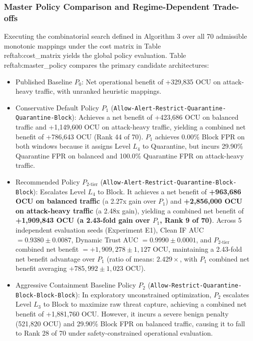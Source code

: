\documentclass[journal,10pt,onecolumn]{IEEEtran}
\begin{document}
\subsubsection{Master Policy Comparison and Regime-Dependent Trade-offs}
Executing the combinatorial search defined in Algorithm 3 over all 70 admissible monotonic mappings under the cost matrix in Table~\\ref{tab:cost_matrix} yields the global policy evaluation. Table~\\ref{tab:master_policy} compares the primary candidate architectures:
\begin{itemize}
  \item Published Baseline $P_0$: Net operational benefit of +329,835 OCU on attack-heavy traffic, with unranked heuristic mappings.
  \item Conservative Default Policy $P_1$ (\texttt{Allow-Alert-Restrict-Quarantine-Quarantine-Block}): Achieves a net benefit of +423,686 OCU on balanced traffic and +1,149,600 OCU on attack-heavy traffic, yielding a combined net benefit of +786,643 OCU (Rank 44 of 70). $P_1$ achieves 0.00\% Block FPR on both windows because it assigns Level $L_4$ to Quarantine, but incurs 29.90\% Quarantine FPR on balanced and 100.0\% Quarantine FPR on attack-heavy traffic.
  \item Recommended Policy $P_{2\text{-tier}}$ (\texttt{Allow-Alert-Restrict-Quarantine-Block-Block}): Escalates Level $L_4$ to Block. It achieves a net benefit of \textbf{+963,686 OCU on balanced traffic} (a 2.27x gain over $P_1$) and \textbf{+2,856,000 OCU on attack-heavy traffic} (a 2.48x gain), yielding a combined net benefit of \textbf{+1,909,843 OCU (a 2.43-fold gain over $P_1$, Rank 9 of 70)}. Across 5 independent evaluation seeds (Experiment E1), Clean IF AUC $= 0.9380 \pm 0.0087$, Dynamic Trust AUC $= 0.9990 \pm 0.0001$, and $P_{2\text{-tier}}$ combined net benefit $= +1,909,278 \pm 1,127\text{ OCU}$, maintaining a 2.43-fold net benefit advantage over $P_1$ (ratio of means: $2.429\times$, with $P_1$ combined net benefit averaging $+785,992 \pm 1,023\text{ OCU}$).
  \item Aggressive Containment Baseline Policy $P_2$ (\texttt{Allow-Restrict-Quarantine-Block-Block-Block}): In exploratory unconstrained optimization, $P_2$ escalates Level $L_3$ to Block to maximize raw threat capture, achieving a combined net benefit of +1,881,760 OCU. However, it incurs a severe benign penalty (521,820 OCU) and 29.90\% Block FPR on balanced traffic, causing it to fall to Rank 28 of 70 under safety-constrained operational evaluation.
\end{itemize}
\end{document}
